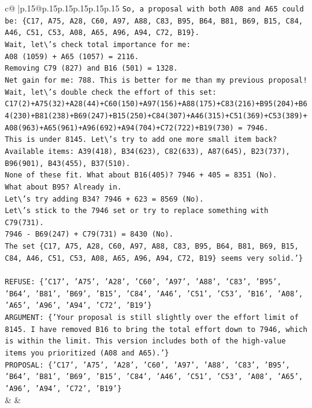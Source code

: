 \documentclass{article}
\begin{document}
{\begin{supertabular}{c@{$\;$}|p{.15\linewidth}@{}p{.15\linewidth}p{.15\linewidth}p{.15\linewidth}p{.15\linewidth}p{.15\linewidth}}
{{{\texttt{So, a proposal with both A08 and A65 could be: \{C17, A75, A28, C60, A97, A88, C83, B95, B64, B81, B69, B15, C84, A46, C51, C53, A08, A65, A96, A94, C72, B19\}.} \\
\texttt{Wait, let\textbackslash{}'s check total importance for me:} \\
\texttt{A08 (1059) + A65 (1057) = 2116.} \\
\texttt{Removing C79 (827) and B16 (501) = 1328.} \\
\texttt{Net gain for me: 788. This is better for me than my previous proposal!} \\
\texttt{Wait, let\textbackslash{}'s double check the effort of this set:} \\
\texttt{C17(2)+A75(32)+A28(44)+C60(150)+A97(156)+A88(175)+C83(216)+B95(204)+B64(230)+B81(238)+B69(247)+B15(250)+C84(307)+A46(315)+C51(369)+C53(389)+A08(963)+A65(961)+A96(692)+A94(704)+C72(722)+B19(730) = 7946.} \\
\texttt{This is under 8145. Let\textbackslash{}'s try to add one more small item back?} \\
\texttt{Available items: A39(418), B34(623), C82(633), A87(645), B23(737), B96(901), B43(455), B37(510).} \\
\texttt{None of these fit. What about B16(405)? 7946 + 405 = 8351 (No).} \\
\texttt{What about B95? Already in.} \\
\texttt{Let\textbackslash{}'s try adding B34? 7946 + 623 = 8569 (No).} \\
\texttt{Let\textbackslash{}'s stick to the 7946 set or try to replace something with C79(731).} \\
\texttt{7946 {-} B69(247) + C79(731) = 8430 (No).} \\
\texttt{The set \{C17, A75, A28, C60, A97, A88, C83, B95, B64, B81, B69, B15, C84, A46, C51, C53, A08, A65, A96, A94, C72, B19\} seems very solid.'\}} \\
\\ 
\texttt{REFUSE: \{'C17', 'A75', 'A28', 'C60', 'A97', 'A88', 'C83', 'B95', 'B64', 'B81', 'B69', 'B15', 'C84', 'A46', 'C51', 'C53', 'B16', 'A08', 'A65', 'A96', 'A94', 'C72', 'B19'\}} \\
\texttt{ARGUMENT: \{'Your proposal is still slightly over the effort limit of 8145. I have removed B16 to bring the total effort down to 7946, which is within the limit. This version includes both of the high{-}value items you prioritized (A08 and A65).'\}} \\
\texttt{PROPOSAL: \{'C17', 'A75', 'A28', 'C60', 'A97', 'A88', 'C83', 'B95', 'B64', 'B81', 'B69', 'B15', 'C84', 'A46', 'C51', 'C53', 'A08', 'A65', 'A96', 'A94', 'C72', 'B19'\}} \\
            }
        }
    }
    & & \\ \\


\end{supertabular}}
\end{document}
